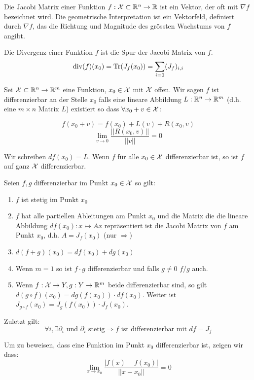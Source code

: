 
Die Jacobi Matrix einer Funktion $f: \mathcal{X} \subset \mathbb{R}^n \to \mathbb{R}$ ist ein Vektor, der oft mit $\nabla f$
bezeichnet wird. Die geometrische Interpretation ist ein Vektorfeld, definiert durch $\nabla f$, das die 
Richtung und Magnitude des grössten Wachstums von $f$ angibt.



Die Divergenz einer Funktion $f$ ist die Spur der Jacobi Matrix von $f$.
$$\text{div}(f)(x_0) = \text{Tr}(J_f(x_0)) = \sum\limits_{i=0} (J_f)_{i,i}$$



Sei $\mathcal{X} \subset \mathbb{R}^n \to \mathbb{R}^m$ eine Funktion, $x_0 \in \mathcal{X}$ mit $\mathcal{X}$ offen. Wir sagen $f$ ist differenzierbar 
an der Stelle $x_0$ falls eine lineare Abbildung $L: \mathbb{R}^n \to \mathbb{R}^m$ (d.h. eine $m \times n$ Matrix $L$) 
existiert so dass $\forall x_0 + v \in \mathcal{X}$:

$$f(x_0 + v) = f(x_0) + L(v) + R(x_0, v)$$
$$\lim_{v \to 0} \frac{||R(x_0, v)||}{||v||} = 0$$

Wir schreiben $df(x_0) = L$. Wenn $f$ für alle $x_0 \in \mathcal{X}$ differenzierbar ist, so ist $f$ auf ganz $\mathcal{X}$ differenzierbar. \medskip

Seien $f, g$ differenzierbar im Punkt $x_0 \in \mathcal{X}$ so gilt:
\begin{enumerate}[label=(\arabic*)]
  \item $f$ ist stetig im Punkt $x_0$
  \item $f$ hat alle partiellen Ableitungen am Punkt $x_0$ und die Matrix die die lineare Abbildung 
  $df(x_0): x \mapsto Ax$ repräsentiert ist die Jacobi Matrix von $f$ am Punkt $x_0$, 
  d.h. $A = J_f(x_0)$ (nur $\Rightarrow$)
  \item $d(f + g)(x_0) = df(x_0) + dg(x_0)$
  \item Wenn $m = 1$ so ist $f \cdot g$ differenzierbar und falls $g \neq 0$ $f / g$ auch.
  \item Wenn $f: \mathcal{X} \to Y, g: Y \to \mathbb{R}^m$ beide differenzierbar sind, so gilt 
  $d(g \circ f)(x_0) = dg(f(x_0)) \cdot df(x_0)$. Weiter ist $J_{g \circ f}(x_0) = J_g(f(x_0)) \cdot J_f(x_0)$.
\end{enumerate}

Zuletzt gilt:
$$ \text{$\forall i, \exists\partial_i$ und $\partial_i$ stetig} \Rightarrow f \text{ ist differenzierbar mit } df = J_f$$

Um zu beweisen, dass eine Funktion im Punkt $x_0$ differenzierbar ist, zeigen wir dass:
$$\lim_{x \to x_0} \frac{|f(x) - f(x_0)|}{||x - x_0||} = 0$$

